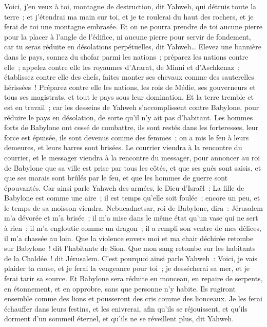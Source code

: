 \begin{multicols}{2}
Voici, j'en veux à toi, montagne de destruction, dit Yahweh, qui détruis toute la terre~; et j'étendrai ma main sur toi, et je te roulerai du haut des rochers, et je ferai de toi une montagne embrasée.
Et on ne pourra prendre de toi aucune pierre pour la placer à l'angle de l'édifice, ni aucune pierre pour servir de fondement, car tu seras réduite en désolations perpétuelles, dit Yahweh…
Elevez une bannière dans le pays, sonnez du shofar parmi les nations~; préparez les nations contre elle~; appelez contre elle les royaumes d'Ararat, de Minni et d'Aschkenaz~; établissez contre elle des chefs, faites monter ses chevaux comme des sauterelles hérissées~!
Préparez contre elle les nations, les rois de Médie, ses gouverneurs et tous ses magistrats, et tout le pays sous leur domination.
Et la terre tremble et est en travail~; car les desseins de Yahweh s'accomplissent contre Babylone, pour réduire le pays en désolation, de sorte qu'il n'y ait pas d'habitant.
Les hommes forts de Babylone ont cessé de combattre, ils sont restés dans les forteresses, leur force est épuisée, ils sont devenus comme des femmes~; on a mis le feu à leurs demeures, et leurs barres sont brisées.
Le courrier viendra à la rencontre du courrier, et le messager viendra à la rencontre du messager, pour annoncer au roi de Babylone que sa ville est prise par tous les côtés,
et que ses gués sont saisis, et que ses marais sont brûlés par le feu, et que les hommes de guerre sont épouvantés.
Car ainsi parle Yahweh des armées, le Dieu d'Israël~: La fille de Babylone est comme une aire~; il est temps qu'elle soit foulée~; encore un peu, et le temps de sa moisson viendra.
Nebucadnetsar, roi de Babylone, dira~: Jérusalem m'a dévorée et m'a brisée~; il m'a mise dans le même état qu'un vase qui ne sert à rien~; il m'a engloutie comme un dragon~; il a rempli son ventre de mes délices, il m'a chassée au loin.
Que la violence envers moi et ma chair déchirée retombe sur Babylone~! dit l'habitante de Sion. Que mon sang retombe sur les habitants de la Chaldée~! dit Jérusalem.
C'est pourquoi ainsi parle Yahweh~: Voici, je vais plaider ta cause, et je ferai la vengeance pour toi~; je dessécherai sa mer, et je ferai tarir sa source.
Et Babylone sera réduite en monceau, en repaire de serpents, en étonnement, et en opprobre, sans que personne n'y habite.
Ils rugiront ensemble comme des lions et pousseront des cris comme des lionceaux.
Je les ferai échauffer dans leurs festins, et les enivrerai, afin qu'ils se réjouissent, et qu'ils dorment d'un sommeil éternel, et qu'ils ne se réveillent plus, dit Yahweh.

\end{multicols}
